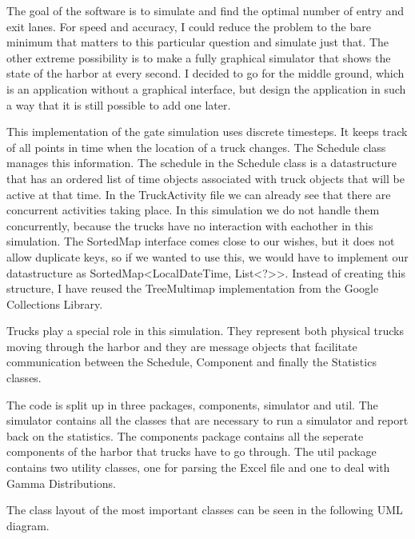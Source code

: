 \documentclass{article}
\begin{document}
The goal of the software is to simulate and find the optimal number of
entry and exit lanes. For speed and accuracy, I could reduce the
problem to the bare minimum that matters to this particular question
and simulate just that. The other extreme possibility is to make a
fully graphical simulator that shows the state of the harbor at every
second. I decided to go for the middle ground, which is an application
without a graphical interface, but design the application in such a
way that it is still possible to add one later.

This implementation of the gate simulation uses discrete timesteps. It
keeps track of all points in time when the location of a truck
changes. The Schedule class manages this information. The schedule in
the Schedule class is a datastructure that has an ordered list of time
objects associated with truck objects that will be active at that
time. In the TruckActivity file we can already see that there are
concurrent activities taking place. In this simulation we do not
handle them concurrently, because the trucks have no interaction with
eachother in this simulation. The SortedMap interface comes close to
our wishes, but it does not allow duplicate keys, so if we wanted to
use this, we would have to implement our datastructure as
SortedMap<LocalDateTime, List<?>>. Instead of creating this structure,
I have reused the TreeMultimap implementation from the Google
Collections Library.

Trucks play a special role in this simulation. They represent both
physical trucks moving through the harbor and they are message objects
that facilitate communication between the Schedule, Component and
finally the Statistics classes.

The code is split up in three packages, components, simulator and
util. The simulator contains all the classes that are necessary to run
a simulator and report back on the statistics. The components package
contains all the seperate components of the harbor that trucks have to
go through. The util package contains two utility classes, one for
parsing the Excel file and one to deal with Gamma Distributions.

The class layout of the most important classes can be seen in the
following UML diagram.
\end{document}
